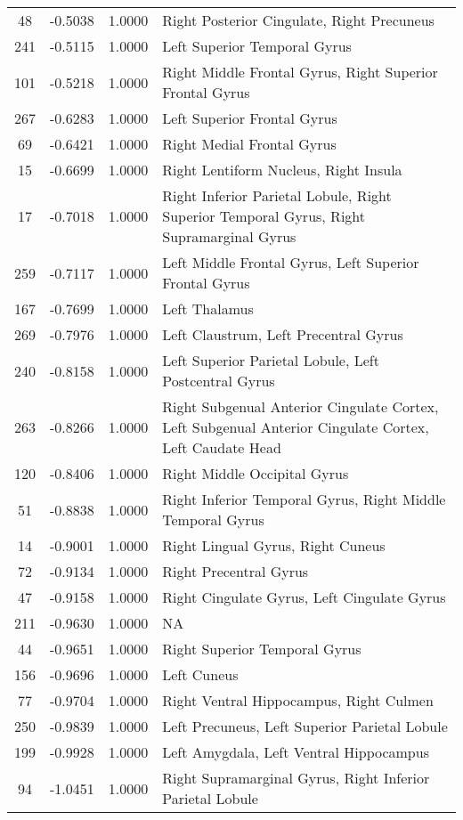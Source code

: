 \documentclass[10pt,letterpaper]{article}\usepackage[]{graphicx}\usepackage[]{color}
\begin{document}
\begin{center}
\begin{longtable}[c]{cccp{4in}}
		48	& -0.5038 & 1.0000 & Right Posterior Cingulate, Right Precuneus \\
		241	& -0.5115 & 1.0000 & Left Superior Temporal Gyrus \\
		101	& -0.5218 & 1.0000 & Right Middle Frontal Gyrus, Right Superior Frontal Gyrus \\
		267	& -0.6283 & 1.0000 & Left Superior Frontal Gyrus \\
		69	& -0.6421 & 1.0000 & Right Medial Frontal Gyrus \\
		15	& -0.6699 & 1.0000 & Right Lentiform Nucleus, Right Insula \\
		17	& -0.7018 & 1.0000 & Right Inferior Parietal Lobule, Right Superior Temporal Gyrus, Right Supramarginal Gyrus \\
		259	& -0.7117 & 1.0000 & Left Middle Frontal Gyrus, Left Superior Frontal Gyrus \\
		167	& -0.7699 & 1.0000 & Left Thalamus \\
		269	& -0.7976 & 1.0000 & Left Claustrum, Left Precentral Gyrus \\
		240	& -0.8158 & 1.0000 & Left Superior Parietal Lobule, Left Postcentral Gyrus \\
		263	& -0.8266 & 1.0000 & Right Subgenual Anterior Cingulate Cortex, Left Subgenual Anterior Cingulate Cortex, Left Caudate Head \\
		120	& -0.8406 & 1.0000 & Right Middle Occipital Gyrus \\
		51	& -0.8838 & 1.0000 & Right Inferior Temporal Gyrus, Right Middle Temporal Gyrus \\
		14	& -0.9001 & 1.0000 & Right Lingual Gyrus, Right Cuneus \\
		72	& -0.9134 & 1.0000 & Right Precentral Gyrus \\
		47	& -0.9158 & 1.0000 & Right Cingulate Gyrus, Left Cingulate Gyrus \\
		211	& -0.9630 & 1.0000 & NA \\
		44	& -0.9651 & 1.0000 & Right Superior Temporal Gyrus \\
		156	& -0.9696 & 1.0000 & Left Cuneus \\
		77	& -0.9704 & 1.0000 & Right Ventral Hippocampus, Right Culmen \\
		250	& -0.9839 & 1.0000 & Left Precuneus, Left Superior Parietal Lobule \\
		199	& -0.9928 & 1.0000 & Left Amygdala, Left Ventral Hippocampus \\
		94	& -1.0451 & 1.0000 & Right Supramarginal Gyrus, Right Inferior Parietal Lobule \\

\end{longtable}
\end{center}
\end{document}
